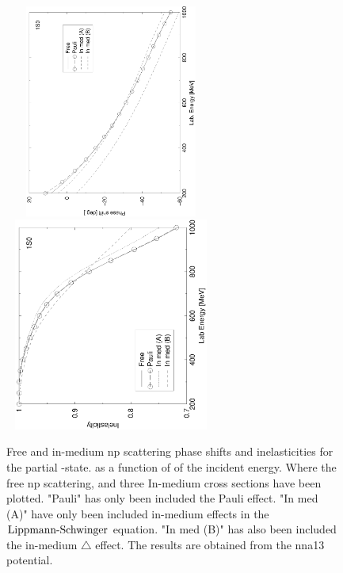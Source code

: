\begin{figure}
\includegraphics[height=7cm,width=7cm,angle=-90]{iii_elastinmedium.eps}
\qquad
\includegraphics[height=7cm,width=7cm,angle=-90]{inelastinmedium.eps}
\caption{
\label{figInmediumphaseSandI}
Free and in-medium np scattering phase shifts and inelasticities for the partial -state. 
as a function of of the incident energy. Where the free np scattering,
and three In-medium cross sections have been plotted. "Pauli" has only been included
the Pauli effect. "In med (A)" have only been included in-medium effects in the
$\text{Lippmann-Schwinger}$ equation. "In med (B)" has also been included the in-medium $\triangle$ effect. The results are obtained from 
the nna13 potential.
}
\end{figure}

